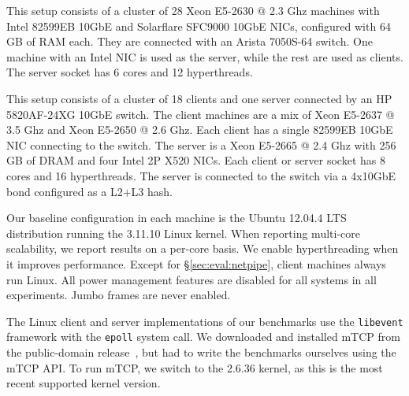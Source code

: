 
  This setup
consists of a cluster of 28 Xeon E5-2630 @ 2.3 Ghz machines with Intel
82599EB 10GbE and Solarflare SFC9000 10GbE NICs, configured with 64 GB
of RAM each. They are connected with an Arista 7050S-64 switch. One
machine with an Intel NIC is used as the server, while the rest are
used as clients. The server socket has 6 cores and 12 hyperthreads.



 This setup consists of a cluster of 18
clients and one server connected by an HP 5820AF-24XG 10GbE switch.
The client machines are a mix of Xeon E5-2637 @ 3.5 Ghz and Xeon
E5-2650 @ 2.6 Ghz.  Each client has a single 82599EB 10GbE NIC
connecting to the switch.  The server is a Xeon E5-2665 @ 2.4 Ghz with
256 GB of DRAM and four Intel 2P X520 NICs.  Each client or server
socket has 8 cores and 16 hyperthreads.  The server is connected
to the switch via a 4x10GbE bond configured as a L2+L3 hash.

 Our baseline configuration in each
machine is the Ubuntu 12.04.4 LTS distribution running the 3.11.10
Linux kernel.  When reporting multi-core scalability, we report
results on a per-core basis. We enable hyperthreading when it improves performance. Except for
\S\ref{sec:eval:netpipe}, client machines always run Linux. All power
management features are disabled for all systems in all
experiments. Jumbo frames are never enabled.




%

%


The Linux client and server implementations of our benchmarks use the
\texttt{libevent} framework with the \texttt{epoll} system call.  We
downloaded and installed mTCP from the public-domain
release~\cite{url:mtcp}, but had to write the benchmarks ourselves
using the mTCP API.  To run mTCP, we switch to the 2.6.36 kernel, as
this is the most recent supported kernel version.


